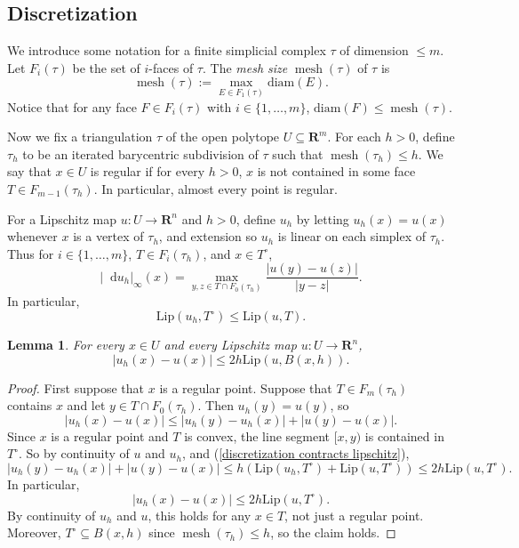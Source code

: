 \documentclass[reqno,11pt]{amsart}
\newcommand{\RR}{\mathbf{R}}
\newcommand*\dif{\mathop{}\!\mathrm{d}}
\DeclareMathOperator{\mesh}{mesh}
\newcommand{\diam}{\mathrm{diam}}
\newcommand{\Lip}{\mathrm{Lip}}
\newcommand{\dfn}[1]{\emph{#1}\index{#1}}
\newtheorem{lemma}[theorem]{Lemma}
\theoremstyle{definition}
\numberwithin{equation}{section}
\begin{document}
\subsection{Discretization}
We introduce some notation for a finite simplicial complex $\tau$ of dimension $\leq m$.
Let $F_i(\tau)$ be the set of $i$-faces of $\tau$.
The \dfn{mesh size} $\mesh(\tau)$ of $\tau$ is 
$$\mesh(\tau) := \max_{E \in F_1(\tau)} \diam(E).$$
Notice that for any face $F \in F_i(\tau)$ with $i \in \{1, \dots, m\}$, $\diam(F) \leq \mesh(\tau)$.

Now we fix a triangulation $\tau$ of the open polytope $U \subseteq \RR^m$.
For each $h > 0$, define $\tau_h$ to be an iterated barycentric subdivision of $\tau$ such that $\mesh(\tau_h) \leq h$.
We say that $x \in U$ is regular if for every $h > 0$, $x$ is not contained in some face $T \in F_{m - 1}(\tau_h)$.
In particular, almost every point is regular.

For a Lipschitz map $u: U \to \RR^n$ and $h > 0$, define $u_h$ by letting $u_h(x) = u(x)$ whenever $x$ is a vertex of $\tau_h$, and extension so $u_h$ is linear on each simplex of $\tau_h$.
Thus for $i \in \{1, \dots, m\}$, $T \in F_i(\tau_h)$, and $x \in T^\circ$,
\begin{equation}\label{discrete derivative is vertex lip}
|\dif u_h|_\infty(x) = \max_{y, z \in T \cap F_0(\tau_h)} \frac{|u(y) - u(z)|}{|y - z|}.
\end{equation}
In particular,
\begin{equation}\label{discretization contracts lipschitz}
\Lip(u_h, T^\circ) \leq \Lip(u, T).
\end{equation}

\begin{lemma}
For every $x \in U$ and every Lipschitz map $u: U \to \RR^n$,
$$|u_h(x) - u(x)| \leq 2h \Lip(u, B(x, h)).$$
\end{lemma}
\begin{proof}
First suppose that $x$ is a regular point.
Suppose that $T \in F_m(\tau_h)$ contains $x$ and let $y \in T \cap F_0(\tau_h)$.
Then $u_h(y) = u(y)$, so 
$$|u_h(x) - u(x)| \leq |u_h(y) - u_h(x)| + |u(y) - u(x)|.$$
Since $x$ is a regular point and $T$ is convex, the line segment $[x, y)$ is contained in $T^\circ$.
So by continuity of $u$ and $u_h$, and (\ref{discretization contracts lipschitz}),
$$|u_h(y) - u_h(x)| + |u(y) - u(x)| \leq h(\Lip(u_h, T^\circ) + \Lip(u, T^\circ)) \leq 2h \Lip(u, T^\circ).$$
In particular, 
$$|u_h(x) - u(x)| \leq 2h \Lip(u, T^\circ).$$
By continuity of $u_h$ and $u$, this holds for any $x \in T$, not just a regular point.
Moreover, $T^\circ \subseteq B(x, h)$ since $\mesh(\tau_h) \leq h$, so the claim holds.
\end{proof}
\end{document}
